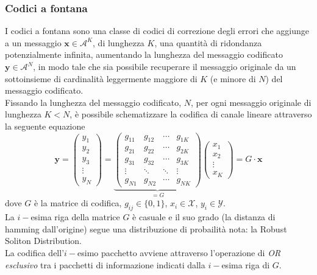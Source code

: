 \documentclass[italian, a4paper, 12pt]{article}
\begin{document}
\subsubsection{Codici a fontana}\label{FCsection}
I codici a fontana sono una classe di codici di correzione degli errori che aggiunge a un messaggio $\bm{x}\in\mathcal{A}^K$, di lunghezza $K$, una quantità di ridondanza potenzialmente infinita, aumentando la lunghezza del messaggio codificato $\bm{y}\in\mathcal{A}^N$, in modo tale che sia possibile recuperare il messaggio originale da un sottoinsieme di cardinalità leggermente maggiore di $K$ (e minore di $N$) del messaggio codificato.\\
Fissando la lunghezza del messaggio codificato, $N$, per ogni messaggio originale di lunghezza $K<N$, è possibile schematizzare la codifica di canale lineare attraverso la seguente equazione
\begin{equation}
\bm{y} = 
\begin{pmatrix}
y_1 \\y_2 \\y_3 \\\vdots \\y_N 
\end{pmatrix} = \underbrace{\begin{pmatrix}
g_{11}	&g_{12}	&\cdots	&g_{1K}\\
g_{21}	&g_{22}	&\cdots	&g_{2K}\\
g_{31}	&g_{32}	&\cdots	&g_{3K}\\
\vdots &\ddots & \ddots &\vdots\\
g_{N1}	&g_{N2}	&\cdots	&g_{NK}
\end{pmatrix}}_{=G} \begin{pmatrix}
x_1 \\x_2 \\\vdots \\x_K
\end{pmatrix} = G \cdot \bm{x}
\end{equation}
dove $G$ è la matrice di codifica, $g_{ij}\in\{0,1\}$, $x_i\in\mathcal{X}$, $y_i\in\mathcal{Y}$.\\
La $i-$esima riga della matrice $G$ è casuale e il suo grado (la distanza di hamming dall'origine) segue una distribuzione di probailità nota: la Robust Soliton Distribution.\\
La codifica dell'$i-$esimo pacchetto avviene attraverso l'operazione di \textit{OR esclusivo} tra i pacchetti di informazione indicati dalla $i-$esima riga di $G$.\\
\end{document}
